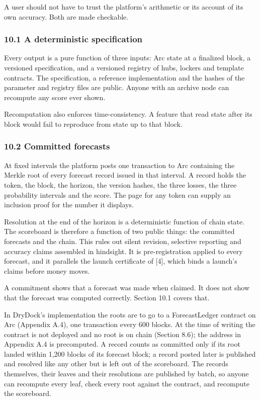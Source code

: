 A user should not have to trust the platform's arithmetic or its account of its own accuracy. Both are made checkable.

\subsubsection{10.1 A deterministic specification}\label{a-deterministic-specification}

Every output is a pure function of three inputs: Arc state at a finalized block, a versioned specification, and a versioned registry of hubs, lockers and template contracts. The specification, a reference implementation and the hashes of the parameter and registry files are public. Anyone with an archive node can recompute any score ever shown.

Recomputation also enforces time-consistency. A feature that read state after its block would fail to reproduce from state up to that block.

\subsubsection{10.2 Committed forecasts}\label{committed-forecasts}

At fixed intervals the platform posts one transaction to Arc containing the Merkle root of every forecast record issued in that interval. A record holds the token, the block, the horizon, the version hashes, the three losses, the three probability intervals and the score. The page for any token can supply an inclusion proof for the number it displays.

Resolution at the end of the horizon is a deterministic function of chain state. The scoreboard is therefore a function of two public things: the committed forecasts and the chain. This rules out silent revision, selective reporting and accuracy claims assembled in hindsight. It is pre-registration applied to every forecast, and it parallels the launch certificate of {[}4{]}, which binds a launch's claims before money moves.

A commitment shows that a forecast was made when claimed. It does not show that the forecast was computed correctly. Section 10.1 covers that.

In DryDock's implementation the roots are to go to a ForecastLedger contract on Arc (Appendix A.4), one transaction every 600 blocks. At the time of writing the contract is not deployed and no root is on chain (Section 8.6); the address in Appendix A.4 is precomputed. A record counts as committed only if its root landed within 1,200 blocks of its forecast block; a record posted later is published and resolved like any other but is left out of the scoreboard. The records themselves, their leaves and their resolutions are published by batch, so anyone can recompute every leaf, check every root against the contract, and recompute the scoreboard.

